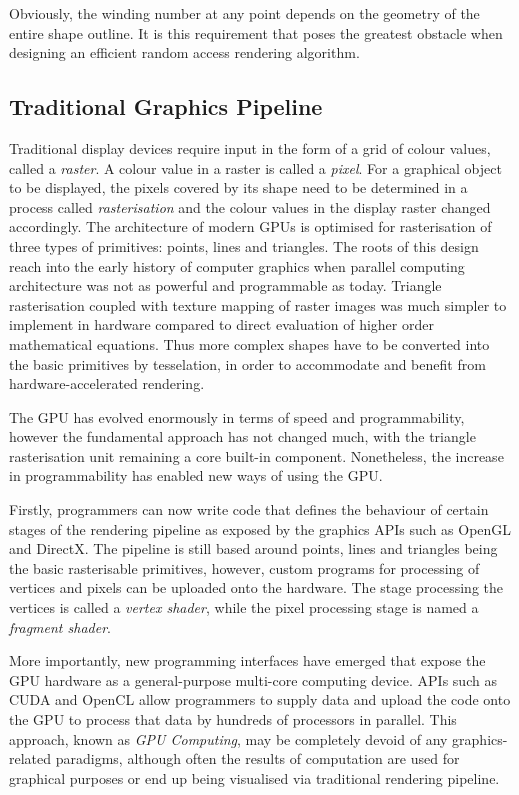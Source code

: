 \documentclass[11pt,a4paper,twoside]{article}
\begin{document}
Obviously, the winding number at any point depends on the geometry of the entire shape outline. It is this requirement that poses the greatest obstacle when designing an efficient random access rendering algorithm.

\subsection{Traditional Graphics Pipeline}

Traditional display devices require input in the form of a grid of colour values, called a \emph{raster}. A colour value in a raster is called a \emph{pixel}. For a graphical object to be displayed, the pixels covered by its shape need to be determined in a process called \emph{rasterisation} and the colour values in the display raster changed accordingly. The architecture of modern GPUs is optimised for rasterisation of three types of primitives: points, lines and triangles. The roots of this design reach into the early history of computer graphics when parallel computing architecture was not as powerful and programmable as today. Triangle rasterisation coupled with texture mapping of raster images was much simpler to implement in hardware compared to direct evaluation of higher order mathematical equations. Thus more complex shapes have to be converted into the basic primitives by tesselation, in order to accommodate and benefit from hardware-accelerated rendering.

The GPU has evolved enormously in terms of speed and programmability, however the fundamental approach has not changed much, with the triangle rasterisation unit remaining a core built-in component. Nonetheless, the increase in programmability has enabled new ways of using the GPU.

Firstly, programmers can now write code that defines the behaviour of certain stages of the rendering pipeline as exposed by the graphics APIs such as OpenGL and DirectX. The pipeline is still based around points, lines and triangles being the basic rasterisable primitives, however, custom programs for processing of vertices and pixels can be uploaded onto the hardware. The stage processing the vertices is called a \emph{vertex shader}, while the pixel processing stage is named a \emph{fragment shader}.

More importantly, new programming interfaces have emerged that expose the GPU hardware as a general-purpose multi-core computing device. APIs such as CUDA and OpenCL allow programmers to supply data and upload the code onto the GPU to process that data by hundreds of processors in parallel. This approach, known as \emph{GPU Computing}, may be completely devoid of any graphics-related paradigms, although often the results of computation are used for graphical purposes or end up being visualised via traditional rendering pipeline.
\end{document}
